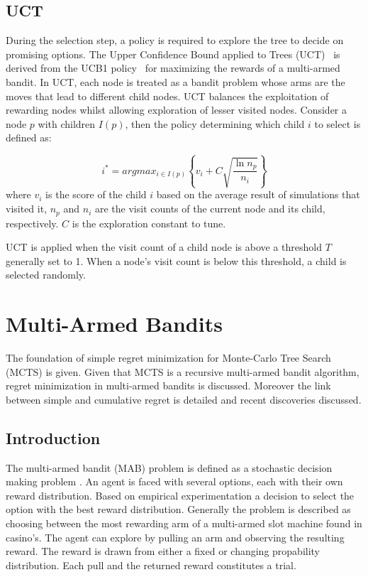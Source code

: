 \documentclass{kecsmstr}
\begin{document}
\section{UCT}
\label{uct}
During the selection step, a policy is required to explore the tree to decide on promising options. The Upper Confidence Bound applied to Trees (UCT)~ is derived from the UCB1 policy~ for maximizing the rewards of a multi-armed bandit. In UCT, each node is treated as a bandit problem whose arms are the moves that lead to different child nodes. UCT balances the exploitation of rewarding nodes whilst allowing exploration of lesser visited nodes. Consider a node $p$ with children $I(p)$, then the policy determining which child $i$ to select is defined as:

\begin{equation}
\label{eq:uct}
i^* = argmax_{i \in I(p)}\left\{ v_i + C \sqrt{ \frac{\ln{n_p}}{n_i}}\right\}
\end{equation}
where $v_i$ is the score of the child $i$ based on the average result of simulations that visited it, $n_p$ and $n_i$ are the visit counts of the current node and its child, respectively. $C$ is the exploration constant to tune. 

UCT is applied when the visit count of a child node is above a threshold $T$ generally set to 1. When a node's visit count is below this threshold, a child is selected randomly.

\chapter{Multi-Armed Bandits}
\label{chap:mab}
\begin{chaptercontents} The foundation of simple regret minimization for Monte-Carlo Tree Search (MCTS) is given. Given that MCTS is a recursive multi-armed bandit algorithm, regret minimization in multi-armed bandits is discussed. Moreover the link between simple and cumulative regret is detailed and recent discoveries discussed.
\end{chaptercontents}

\section{Introduction}
The multi-armed bandit (MAB) problem is defined as a stochastic decision making problem . An agent is faced with several options, each with their own reward distribution. Based on empirical experimentation a decision to select the option with the best reward distribution. Generally the problem is described as choosing between the most rewarding arm of a multi-armed slot machine found in casino's. The agent can explore by pulling an arm and observing the resulting reward. The reward is drawn from either a fixed or changing propability distribution. Each pull and the returned reward constitutes a trial. 
\end{document}
